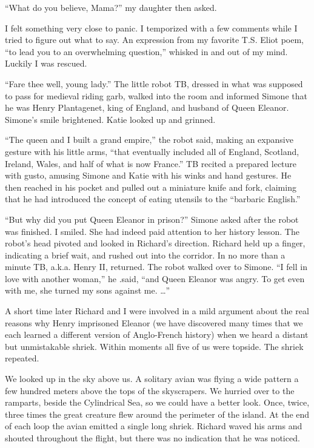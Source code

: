 \documentclass[]{article}
\begin{document}
“What do you believe, Mama?” my daughter then asked.

I felt something very close to panic. I temporized with a few comments while I tried to figure out what to say. An expression from my favorite T.S. Eliot poem, “to lead you to an overwhelming question,” whisked in and out of my mind. Luckily I was rescued.

“Fare thee well, young lady.” The little robot TB, dressed in what was supposed to pass for medieval riding garb, walked into the room and informed Simone that he was Henry Plantagenet, king of England, and husband of Queen Eleanor. Simone’s smile brightened. Katie looked up and grinned.

“The queen and I built a grand empire,” the robot said, making an expansive gesture with his little arms, “that eventually included all of England, Scotland, Ireland, Wales, and half of what is now France.” TB recited a prepared lecture with gusto, amusing Simone and Katie with his winks and hand gestures. He then reached in his pocket and pulled out a miniature knife and fork, claiming that he had introduced the concept of eating utensils to the “barbaric English.”

“But why did you put Queen Eleanor in prison?” Simone asked after the robot was finished. I smiled. She had indeed paid attention to her history lesson. The robot’s head pivoted and looked in Richard’s direction. Richard held up a finger, indicating a brief wait, and rushed out into the corridor. In no more than a minute TB, a.k.a. Henry II, returned. The robot walked over to Simone. “I fell in love with another woman,” he .said, “and Queen Eleanor was angry. To get even with me, she turned my sons against me. …”

A short time later Richard and I were involved in a mild argument about the real reasons why Henry imprisoned Eleanor (we have discovered many times that we each learned a different version of Anglo-French history) when we heard a distant but unmistakable shriek. Within moments all five of us were topside. The shriek repeated.

We looked up in the sky above us. A solitary avian was flying a wide pattern a few hundred meters above the tops of the skyscrapers. We hurried over to the ramparts, beside the Cylindrical Sea, so we could have a better look. Once, twice, three times the great creature flew around the perimeter of the island. At the end of each loop the avian emitted a single long shriek. Richard waved his arms and shouted throughout the flight, but there was no indication that he was noticed.
\end{document}
